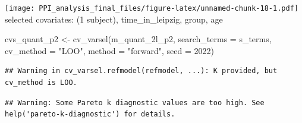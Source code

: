 \documentclass[
]{article}
\newenvironment{Shaded}{\begin{snugshade}}{\end{snugshade}}
\newcommand{\AttributeTok}[1]{\textcolor[rgb]{0.77,0.63,0.00}{#1}}
\newcommand{\DecValTok}[1]{\textcolor[rgb]{0.00,0.00,0.81}{#1}}
\newcommand{\FunctionTok}[1]{\textcolor[rgb]{0.00,0.00,0.00}{#1}}
\newcommand{\NormalTok}[1]{#1}
\newcommand{\OtherTok}[1]{\textcolor[rgb]{0.56,0.35,0.01}{#1}}
\newcommand{\StringTok}[1]{\textcolor[rgb]{0.31,0.60,0.02}{#1}}
\begin{document}
\texttt{[image: PPI\_analysis\_final\_files/figure-latex/unnamed-chunk-18-1.pdf]}
selected covariates: (1 \textbar{} subject), time\_in\_leipzig, group, age

\begin{Shaded}
\begin{Highlighting}[]
\NormalTok{cvs\_quant\_p2 }\OtherTok{\textless{}{-}} \FunctionTok{cv\_varsel}\NormalTok{(m\_quant\_2l\_p2, }
                       \AttributeTok{search\_terms =}\NormalTok{ s\_terms, }
                       \AttributeTok{cv\_method =} \StringTok{"LOO"}\NormalTok{, }\AttributeTok{method =} \StringTok{"forward"}\NormalTok{, }
                       \AttributeTok{seed =} \DecValTok{2022}\NormalTok{)}
\end{Highlighting}
\end{Shaded}

\begin{verbatim}
## Warning in cv_varsel.refmodel(refmodel, ...): K provided, but cv_method is LOO.
\end{verbatim}

\begin{verbatim}
## Warning: Some Pareto k diagnostic values are too high. See help('pareto-k-diagnostic') for details.
\end{verbatim}
\end{document}

